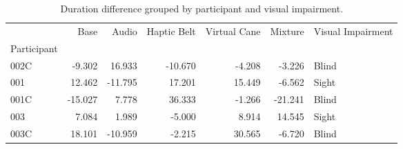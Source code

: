 
\begin{table}[!htb]
\centering
\caption{Duration difference grouped by participant and visual impairment.}
\label{tab:duracao_var_group}
\begin{tabular}{lrrrrrl}
\toprule
{} &    Base &   Audio &  Haptic Belt &  Virtual Cane &  Mixture & Visual Impairment \\
Participant &         &         &              &               &          &                   \\
\midrule
002C        &  -9.302 &  16.933 &      -10.670 &        -4.208 &   -3.226 &             Blind \\
001         &  12.462 & -11.795 &       17.201 &        15.449 &   -6.562 &             Sight \\
001C        & -15.027 &   7.778 &       36.333 &        -1.266 &  -21.241 &             Blind \\
003         &   7.084 &   1.989 &       -5.000 &         8.914 &   14.545 &             Sight \\
003C        &  18.101 & -10.959 &       -2.215 &        30.565 &   -6.720 &             Blind \\
\bottomrule
\end{tabular}
\end{table}

